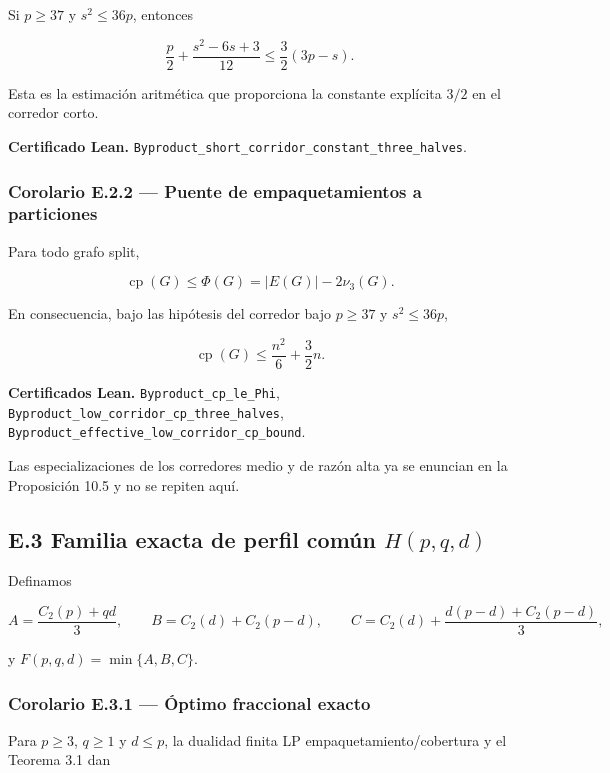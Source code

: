 \documentclass[
  spanish,
  11pt,
  a4paper,
]{article}
\begin{document}
Si \(p\ge37\) y \(s^2\le36p\), entonces

\[\frac p2+\frac{s^2-6s+3}{12}\le\frac32(3p-s).\]

Esta es la estimación aritmética que proporciona la constante explícita \(3/2\) en el corredor corto.

\textbf{Certificado Lean.} \texttt{Byproduct\_short\_corridor\_constant\_three\_halves}.

\subsubsection{Corolario E.2.2 --- Puente de empaquetamientos a particiones}\label{corolario-e.2.2-puente-de-empaquetamientos-a-particiones}

Para todo grafo split,

\[\operatorname{cp}(G)\le \Phi(G)=|E(G)|-2\nu_3(G).\]

En consecuencia, bajo las hipótesis del corredor bajo \(p\ge37\) y \(s^2\le36p\),

\[\operatorname{cp}(G)\le \frac{n^2}{6}+\frac32n.\]

\textbf{Certificados Lean.} \texttt{Byproduct\_cp\_le\_Phi}, \texttt{Byproduct\_low\_corridor\_cp\_three\_halves}, \texttt{Byproduct\_effective\_low\_corridor\_cp\_bound}.

Las especializaciones de los corredores medio y de razón alta ya se enuncian en la Proposición 10.5 y no se repiten aquí.

\subsection{\texorpdfstring{E.3 Familia exacta de perfil común \(H(p,q,d)\)}{E.3 Familia exacta de perfil común H(p,q,d)}}\label{e.3-familia-exacta-de-perfil-comuxfan-hpqd}

Definamos

\[A=\frac{C_2(p)+qd}{3},\qquad B=C_2(d)+C_2(p-d),\qquad C=C_2(d)+\frac{d(p-d)+C_2(p-d)}{3},\]

y \(F(p,q,d)=\min\{A,B,C\}\).

\subsubsection{Corolario E.3.1 --- Óptimo fraccional exacto}\label{corolario-e.3.1-uxf3ptimo-fraccional-exacto}

Para \(p\ge3\), \(q\ge1\) y \(d\le p\), la dualidad finita LP empaquetamiento/cobertura y el Teorema 3.1 dan
\end{document}
